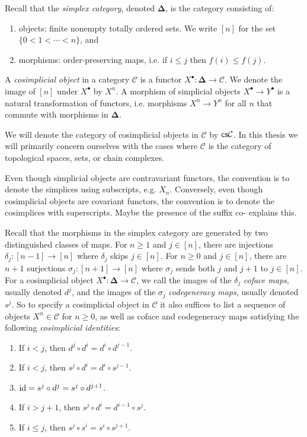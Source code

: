 Recall that the \emph{simplex category}, denoted $\boldsymbol{\Delta}$, is the category consisting of:
\begin{enumerate}
    \item objects: finite nonempty totally ordered sets. We write $[n]$ for the set $\{0<1<\cdots < n\}$, and 
    \item morphisms: order-preserving maps, i.e. if $i\leq j$ then $f(i)\leq f(j)$.
\end{enumerate}  
\begin{defn}
A \emph{cosimplicial object} in a category $\mathcal{C}$ is a functor $X^\bullet: \boldsymbol{\Delta}\to \mathcal{C}$. We denote the image of $[n]$ under $X^\bullet$ by $X^n$. A morphism of simplicial objects $X^\bullet\to  Y^\bullet$ is a natural transformation of functors, i.e. morphisms $X^n\to Y^n$ for all $n$ that commute with morphisms in $\boldsymbol{\Delta}$.
\end{defn}
We will denote the category of cosimplicial objects in $\mathcal{C}$ by $\mathsf{cs}\mathcal{C}$. In this thesis we will primarily concern ourselves with the cases where $\mathcal{C}$ is the category of topological spaces, sets, or chain complexes.
\begin{rem}
Even though simplicial objects are {contravariant} functors, the convention is to denote the simplices using subscripts, e.g. $X_n$. Conversely, even though cosimplicial objects are {covariant} functors, the convention is to denote the cosimplices with superscripts. Maybe the presence of the suffix co- explains this.
\end{rem}
Recall that the morphisms in the simplex category are generated by two distinguished classes of maps. For $n\geq 1$ and $j\in [n]$, there are injections $\delta_j: [n-1] \to [n]$ where $\delta_j$ skips $j \in [n]$. For $n\geq 0$ and $j\in [n]$, there are $n+1$ surjections $\sigma_j: [n+1]\to [n]$ where $\sigma_j$ sends both $j$ and $j+1$ to $j \in [n]$. For a cosimplicial object $X^\bullet: \boldsymbol{\Delta} \to\mathcal{C}$, we call the images of the $\delta_j$ \textit{coface maps}, usually denoted $d^j$, and the images of the $\sigma_j$ \textit{codegeneracy maps}, usually denoted $s^j$. So to specify a cosimplicial object in $\mathcal{C}$ it also suffices to list a sequence of objects $X^n \in \mathcal{C}$ for $n\geq 0$, as well as coface and codegeneracy maps satisfying the following \emph{cosimplicial identities}:
\begin{enumerate}
      \item If $i<j$, then $d^j \circ d^i = d^i \circ d^{j-1}$.
      \item If $i<j$, then $s^j \circ d^i = d^i \circ s^{j-1}$.
      \item $\operatorname{id} = s^j \circ d^j = s^j \circ d^{j+1}$.
      \item If $i > j+1$, then $s^j \circ d^i = d^{i-1}\circ s^j$.
      \item If $i\leq j$, then $s^j \circ s^i = s^i \circ s^{j+1}$.
\end{enumerate}
